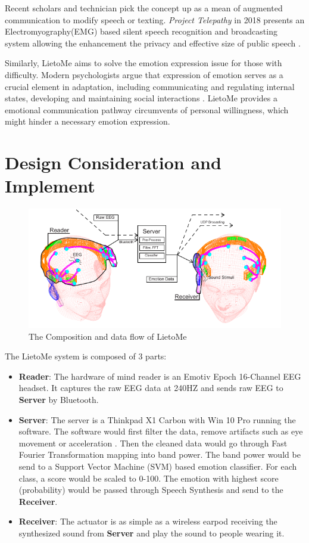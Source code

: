 \documentclass[a4paper]{article}
\begin{document}
Recent scholars and technician pick the concept up as a mean of augmented communication to modify speech or texting. \textit{Project Telepathy} in 2018 presents an Electromyography(EMG) based silent speech recognition and broadcasting system allowing the enhancement the privacy and effective size of public speech \autocite{bourland2017project}. 

Similarly, LietoMe aims to solve the emotion expression issue for those with difficulty. Modern psychologists argue that expression of emotion serves as a crucial element in adaptation, including communicating and regulating internal states, developing and maintaining social interactions \autocite{bonanno2004importance}. LietoMe provides a emotional communication pathway circumvents of personal willingness, which might hinder a necessary emotion expression.

\section{Design Consideration and Implement}

\begin{figure}[H]
	\centering
	\includegraphics[width=\linewidth]{Diagram_2}
	\caption{The Composition and data flow of LietoMe}
	\label{fig:comp}
\end{figure}

The LietoMe system is composed of 3 parts:

\begin{itemize}
    \item \textbf {Reader}: The hardware of mind reader is an Emotiv Epoch 16-Channel EEG headset. It captures the raw EEG data at 240HZ and sends raw EEG to \textbf{Server} by Bluetooth.
    \item \textbf {Server}: The server is a Thinkpad X1 Carbon with Win 10 Pro running the software. The software would first filter the data, remove artifacts such as eye movement or acceleration \autocite{le2011method}. Then the cleaned data would go through Fast Fourier Transformation mapping into band power. The band power would be send to a Support Vector Machine (SVM) based emotion classifier. For each class, a score would be scaled to 0-100. The emotion with highest score (probability) would be passed through Speech Synthesis and send to the \textbf{Receiver}.
    \item \textbf{Receiver}: The actuator is as simple as a wireless earpod receiving the synthesized sound from \textbf {Server} and play the sound to people wearing it.
\end{itemize}
\end{document}
